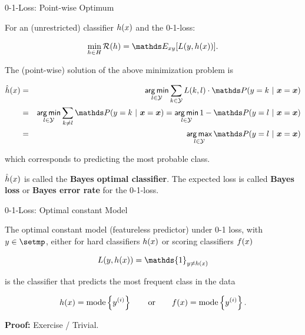 \begin{vbframe}{0-1-Loss: Point-wise Optimum}

For an (unrestricted) classifier $h(x)$ and the 0-1-loss: 

$$
\min_{h \in \Hspace} \risk(h) = \E_{xy}[L(y, \hx)]. 
$$

The (point-wise) solution of the above minimization problem is

\begin{footnotesize}
  \begin{eqnarray*}  
  \hxh &=& \argmin_{l \in \Yspace} \sum_{k \in \Yspace} L(k, l) \cdot \P(y = k~|~\xv = \xv) \\
  &=& \argmin_{l \in \Yspace} \sum_{k \ne l} \P(y = k~|~\xv = \xv) = \argmin_{l \in \Yspace} 1 - \P(y = l~|~\xv = \xv) \\
  &=& \argmax_{l \in \Yspace} \P(y = l~|~ \xv = \xv)
  \end{eqnarray*}
\end{footnotesize}

which corresponds to predicting the most probable class. 

\lz 

$\hat{h}(x)$ is called the \textbf{Bayes optimal classifier}. The expected loss is called \textbf{Bayes loss} or \textbf{Bayes error rate} for the 0-1-loss.


\end{vbframe}

\begin{vbframe}{0-1-Loss: Optimal constant Model}

The optimal constant model (featureless predictor) under 0-1 loss, with $y \in \setmp$, either for hard classifiers $h(x)$ or scoring classifiers $f(x)$ 

$$
  L(y, \hx) = \mathds{1}_{y \neq \hx}
$$

is the classifier that predicts the most frequent class in the data


$$
h(x) = \text{mode} \left\{y^{(i)}\right\} \qquad \text{or} \qquad f(x) = \text{mode} \left\{y^{(i)}\right\}.
$$

\textbf{Proof:} Exercise / Trivial. 



\end{vbframe}





